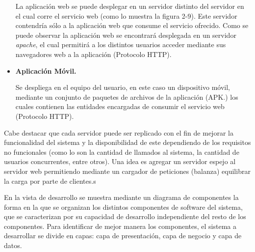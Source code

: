 \documentclass{memoria}
\begin{document}
\begin{itemize}
La aplicación web se puede desplegar en un servidor distinto del servidor en el cual corre el servicio web (como lo muestra la figura 2-9). Este servidor contendría sólo a la aplicación web que consume el servicio ofrecido. Como se puede observar la aplicación web se encontrará desplegada en un servidor \textsl{apache}, el cual permitirá a los distintos usuarios acceder mediante sus navegadores web a la aplicación (Protocolo HTTP).

\item \textbf{Aplicación Móvil.}

Se despliega en el equipo del usuario, en este caso un dispositivo móvil, mediante un conjunto de paquetes de archivos de la aplicación (APK.) los cuales contienen las entidades encargadas de consumir el servicio web (Protocolo HTTP).
\end{itemize}

Cabe destacar que cada servidor puede ser replicado con el fin de mejorar la funcionalidad del sistema y la disponibilidad de este dependiendo de los requisitos no funcionales (como lo son la cantidad de llamados al sistema, la cantidad de usuarios concurrentes, entre otros). Una idea es agregar un servidor espejo al servidor web permitiendo mediante un cargador de peticiones (balanza) equilibrar la carga por parte de clientes.s



En la vista de desarrollo se muestra mediante un diagrama de componentes la forma en la que se organizan los distintos componentes de software del sistema, que se caracterizan por su capacidad de desarrollo independiente del resto de los componentes. Para identificar de mejor manera los componentes, el sistema a desarrollar se divide en capas: capa de presentación, capa de negocio y capa de datos.

\end{document}
